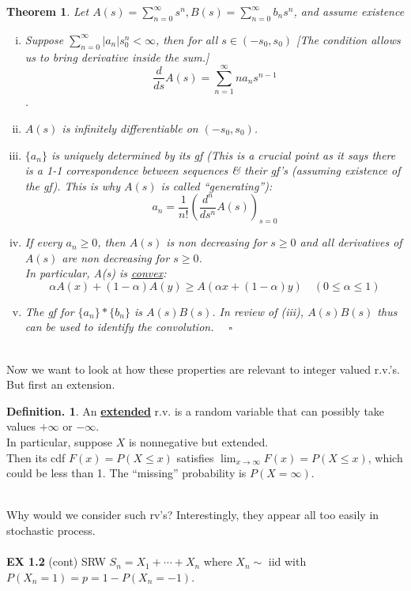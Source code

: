 \documentclass[12pt]{article}
\theoremstyle{definition}
\newtheorem{mydef}{Definition.}[section]
\theoremstyle{plain}
\newtheorem{mythm}{Theorem}[section]
\begin{document}
\begin{mythm}
Let $A(s) = \sum_{n=0}^\infty s^n, B(s) = \sum_{n=0}^\infty b_n s^n$, and assume existence
\begin{enumerate}[(i)]
\item Suppose $\sum_{n=0}^\infty |a_n| s_0^n < \infty$, then for all $s \in (-s_0, s_0)$ [The condition allows us to bring derivative inside the sum.] \[\frac{d}{ds}A(s) = \sum_{n=1}^\infty n a_n s^{n-1}\].
\item $A(s)$ is infinitely differentiable on $(-s_0, s_0)$.
\item $\{a_n\}$ is uniquely determined by its gf (This is a crucial point as it says there is a 1-1 correspondence between sequences \& their gf's (assuming existence of the gf). This is why $A(s)$ is called ``generating''): \[a_n = \frac{1}{n!} (\frac{d^n}{ds^n}A(s))_{s=0}\]
\item If every $a_n \geq 0$, then $A(s)$ is non decreasing for $s \geq 0$ and all derivatives of $A(s)$ are non decreasing for $s \geq 0$.\\
In particular, A(s) is \underline{convex}: \[\alpha A(x) + (1-\alpha) A(y) \geq A(\alpha x + (1-\alpha)y) \quad (0 \leq \alpha \leq 1)\]
\item The gf for $\{a_n\}*\{b_n\}$ is $A(s)B(s)$. In review of (iii), $A(s)B(s)$ thus can be used to identify the convolution.  $\quad \square$ 
\end{enumerate}
\end{mythm}
$\mbox{}$\\
Now we want to look at how these properties are relevant to integer valued r.v.'s.\\
But first an extension.
\begin{mydef}
An \underline{\textbf{extended}} r.v. is a random variable that can possibly take values $+\infty$ or $-\infty$. \\
In particular, suppose $X$ is nonnegative but extended. \\
Then its cdf $F(x)=P(X \leq x)$ satisfies $\lim_{x \rightarrow \infty} F(x) = P(X \leq x)$, which could be less than 1. The ``missing'' probability is $P(X = \infty)$.
\end{mydef}
$\mbox{}$\\
Why would we consider such rv's? Interestingly, they appear all too easily in stochastic process. \\ \\
\textbf{EX 1.2} (cont) SRW $S_n = X_1 + \cdots + X_n$ where $X_n \sim$ iid with $P(X_n = 1)=p = 1- P(X_n = -1)$. \\
\end{document}
